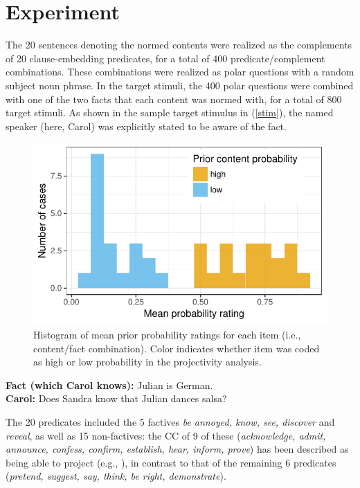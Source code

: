 \documentclass[11pt,fleqn]{article}
\newcommand{\6}{\mbox{$[\hspace*{-.6mm}[$}}
\newcommand{\9}{\mbox{$]\hspace*{-.6mm}]$}}
\begin{document}
 
\section{Experiment}\label{s3}

The 20 sentences denoting the normed contents were realized as the complements of 20 clause-embedding predicates, for a total of 400 predicate/complement combinations. These combinations were realized as polar questions with a random subject noun phrase. In the target stimuli, the 400 polar questions were combined with one of the two facts that each content was normed with, for a total of 800 target stimuli. As shown in the sample target stimulus in (\ref{stim}), the named speaker (here, Carol) was explicitly stated to be aware of the fact.

\begin{figure}[h]
\centering
\includegraphics[width=.32\paperwidth]{../../results/1-prior/graphs/meanprobratings}
\caption{Histogram of mean prior probability ratings for each item (i.e., content/fact combination). Color indicates whether item was coded as high or low probability in the projectivity analysis.}\label{f-prior}
\end{figure}


\begin{exe}
\ex\label{stim}
{\bf Fact (which Carol knows):} Julian is German.  \\ 
{\bf Carol:} Does Sandra know that Julian dances salsa?
\end{exe}

The 20 predicates included the 5 factives {\em be annoyed, know, see, discover} and {\em reveal}, as well as 15 non-factives: the CC of 9 of these ({\em acknowledge, admit, announce, confess, confirm, establish, hear, inform, prove}) has been described as being able to project (e.g., \citealt{schlenker10,anand-hacquard2014,spector-egre2015,tbd-variability}), in contrast to that of the remaining 6 predicates ({\em pretend, suggest, say, think, be right, demonstrate}).
\end{document}
